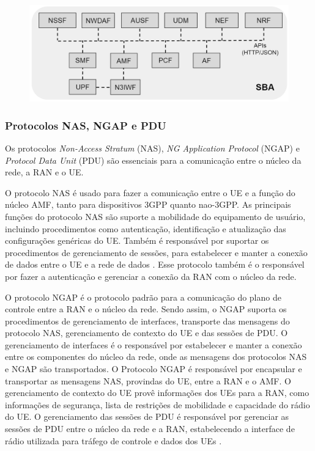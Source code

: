 \begin{figure}
    \centering
    \includegraphics[width=1\textwidth]{TG1/Images/Core5G.png}
    \label{fig:5Gcore}
\end{figure}

\subsubsection{Protocolos NAS, NGAP e PDU}

Os protocolos \textit{Non-Access Stratum} (NAS), \textit{NG Application Protocol} (NGAP) e \textit{Protocol Data Unit} (PDU) são essenciais para a comunicação entre o núcleo da rede, a RAN e o UE. 

O protocolo NAS é usado para fazer a comunicação entre o UE e a função do núcleo AMF, tanto para dispositivos 3GPP quanto nao-3GPP. As principais funções do protocolo NAS são suporte a mobilidade do equipamento de usuário, incluindo procedimentos como autenticação, identificação e atualização das configurações genéricas do UE. Também é responsável por suportar os procedimentos de gerenciamento de sessões, para estabelecer e manter a conexão de dados entre o UE e a rede de dados \cite{3gpp.24.501}. Esse protocolo também é o responsável por fazer a autenticação e gerenciar a conexão da RAN com o núcleo da rede.

O protocolo NGAP é o protocolo padrão para a comunicação do plano de controle entre a RAN e o núcleo da rede. Sendo assim, o NGAP suporta os procedimentos de gerenciamento de interfaces, transporte das mensagens do protocolo NAS, gerenciamento de contexto do UE e das sessões de PDU. O gerenciamento de interfaces é o responsável por estabelecer e manter a conexão entre os componentes do núcleo da rede, onde as mensagens dos protocolos NAS e NGAP são transportados. O Protocolo NGAP é responsável por encapsular e transportar as mensagens NAS, provindas do UE, entre a RAN e o AMF. O gerenciamento de contexto do UE provê informações dos UEs para a RAN, como informações de segurança, lista de restrições de mobilidade e capacidade do rádio do UE. O gerenciamento das sessões de PDU é responsável por gerenciar as sessões de PDU entre o núcleo da rede e a RAN, estabelecendo a interface de rádio utilizada para tráfego de controle e dados dos UEs \cite{3gpp.38.413}.

